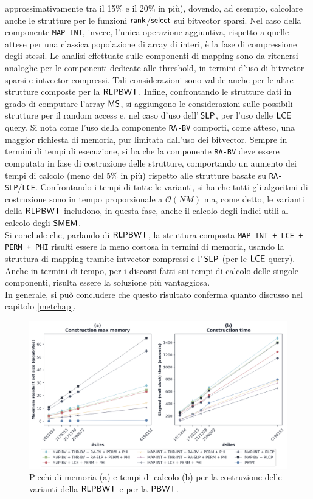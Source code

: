 approssimativamente tra il 15\% e il 20\% in più), dovendo, ad esempio,
calcolare anche le strutture per le funzioni $\mbox{\rm {\sf rank}}$/$\mbox{\rm {\sf select}}$ sui bitvector
sparsi. Nel caso della componente 
\texttt{MAP-INT}, invece, l'unica operazione aggiuntiva, rispetto a quelle attese
per una classica popolazione di array di interi, è la fase di compressione degli
stessi. Le analisi effettuate sulle componenti di mapping sono da
ritenersi analoghe per le componenti dedicate alle threshold, in
termini d'uso di bitvector sparsi e intvector compressi.
Tali considerazioni sono valide anche per le altre strutture
composte per la $\mbox{\rm {\sf RLPBWT}}$. Infine, confrontando le strutture dati in grado
di computare l'array $\mbox{\rm {\sf MS}}$, si aggiungono le considerazioni sulle possibili
strutture per il random access e, nel caso d'uso dell'$\,\mbox{\rm {\sf SLP}}$, per l'uso
delle $\mbox{\rm {\sf LCE}}$ query. Si nota come l'uso della componente \texttt{RA-BV}
comporti, come atteso, una maggior richiesta di memoria, pur limitata dall'uso
dei bitvector. Sempre in termini di tempi di esecuzione, si ha che la
componente \texttt{RA-BV} deve essere computata in fase di costruzione delle
strutture, comportando un aumento dei tempi di calcolo (meno del 5\% in
più) rispetto alle strutture basate su
\texttt{RA-SLP}/\texttt{LCE}. Confrontando i tempi di  
tutte le varianti, si ha che tutti gli algoritmi di costruzione sono in tempo
proporzionale a $\mathcal{O}(NM)$ ma, come detto, le varianti della
$\mbox{\rm {\sf RLPBWT}}$ includono, in questa fase, anche il calcolo degli indici
utili al calcolo degli $\mbox{\rm {\sf SMEM}}$. \\
Si conclude che, parlando di $\mbox{\rm {\sf RLPBWT}}$, la
struttura composta \texttt{MAP-INT + LCE + PERM + PHI} risulti essere la meno
costosa in termini di memoria, usando la struttura di mapping tramite
intvector compressi e l'$\,\mbox{\rm {\sf SLP}}$ (per le $\mbox{\rm {\sf LCE}}$ query).
Anche in termini di tempo, per i discorsi fatti sui tempi di calcolo
delle singole componenti, risulta essere la soluzione più vantaggiosa.\\
In generale, si può 
concludere che questo risultato conferma quanto discusso nel capitolo
\ref{metchap}.\\ 
\begin{figure}
  \centering
  \includegraphics[width=\linewidth]{img/make_time_mem_paper.png}
  \caption{Picchi di memoria (a) e tempi di calcolo (b) per la
    costruzione delle varianti della $\mbox{\rm {\sf RLPBWT}}$ e per 
    la $\mbox{\rm {\sf PBWT}}$.}
  \label{fig:maketimememchr}
\end{figure}
